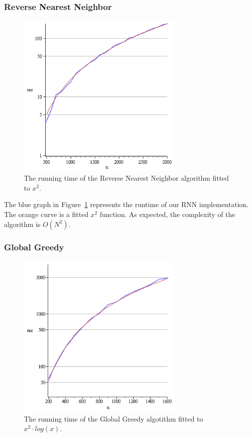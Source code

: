 \documentclass[a4paper,11pt]{article}
\begin{document}
\subsubsection{Reverse Nearest Neighbor}

\begin{figure}[ht!]
\centering 
\includegraphics[width=80mm]{RNN_runtime.png}
\caption{The running time of the Reverse Nearest Neighbor algorithm fitted to $x^2$.}
\label{rnn} 
\end{figure}

The blue graph in Figure~\ref{rnn} represents the runtime of our RNN implementation. The orange curve is a fitted $x^2$ function. As expected, the complexity of the algorithm is $O(N^{2})$.

\subsubsection{Global Greedy}

\begin{figure}[ht!]
\centering 
\includegraphics[width=80mm]{GG_runtime.png}
\caption{The running time of the Global Greedy algotithm fitted to $x^2 \cdot log(x)$.}
\label{gg} 
\end{figure}
\end{document}
